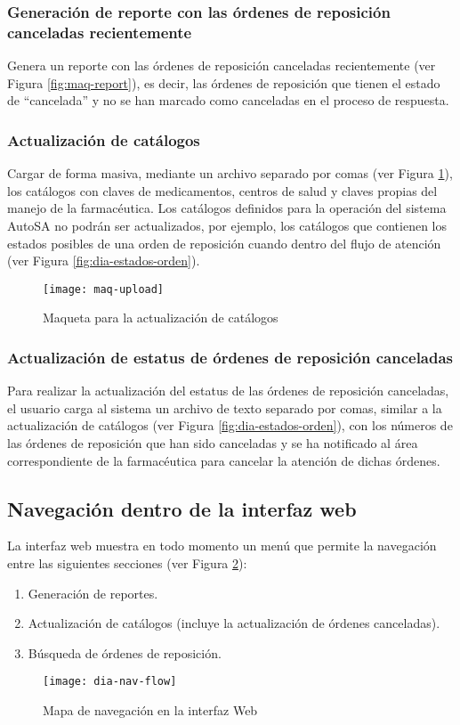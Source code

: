 \subsubsection{Generación de reporte con las órdenes de reposición canceladas recientemente}
Genera un reporte con las órdenes de reposición canceladas recientemente (ver Figura \ref{fig:maq-report}), es decir, las órdenes de reposición que tienen el estado de “cancelada” y no se han marcado como canceladas en el proceso de respuesta.

\subsubsection{Actualización de catálogos}
Cargar de forma masiva, mediante un archivo separado por comas (ver Figura \ref{fig:maq-upload}), los catálogos con claves de medicamentos, centros de salud y claves propias del manejo de la farmacéutica. Los catálogos definidos para la operación del sistema AutoSA no podrán ser actualizados, por ejemplo, los catálogos que contienen los estados posibles de una orden de reposición cuando dentro del flujo de atención (ver Figura \ref{fig:dia-estados-orden}).
\begin{figure}[h]
  \centering
  \texttt{[image: maq-upload]}
  \caption{Maqueta para la actualización de catálogos}
  \label{fig:maq-upload}
\end{figure}

\subsubsection{Actualización de estatus de órdenes de reposición canceladas}
Para realizar la actualización del estatus de las órdenes de reposición canceladas, el usuario carga al sistema un archivo de texto separado por comas, similar a la actualización de catálogos (ver Figura \ref{fig:dia-estados-orden}), con los números de las órdenes de reposición que han sido canceladas y se ha notificado al área correspondiente de la farmacéutica para cancelar la atención de dichas órdenes.

\subsection{Navegación dentro de la interfaz web}
La interfaz web muestra en todo momento un menú que permite la navegación entre las siguientes secciones (ver Figura \ref{fig:dia-nav-flow}):
\begin{enumerate}
  \item Generación de reportes.
  \item Actualización de catálogos (incluye la actualización de órdenes canceladas).
  \item Búsqueda de órdenes de reposición.
\end{enumerate}
\begin{figure}[h]
  \centering
  \texttt{[image: dia-nav-flow]}
  \caption{Mapa de navegación en la interfaz Web}
  \label{fig:dia-nav-flow}
\end{figure}



